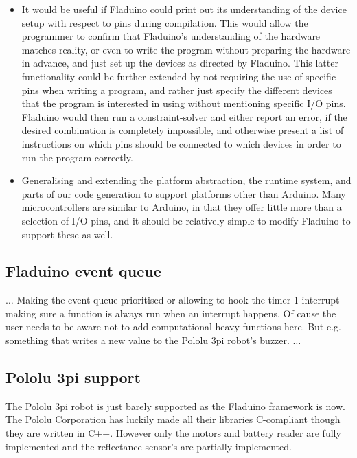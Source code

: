 \documentclass[a4paper, oneside, final]{memoir}
\begin{document}
\begin{itemize}
\item It would be useful if Fladuino could print out its understanding
  of the device setup with respect to pins during compilation.  This
  would allow the programmer to confirm that Fladuino's understanding
  of the hardware matches reality, or even to write the program
  without preparing the hardware in advance, and just set up the
  devices as directed by Fladuino.  This latter functionality could be
  further extended by not requiring the use of specific pins when
  writing a program, and rather just specify the different devices
  that the program is interested in using without mentioning specific
  I/O pins.  Fladuino would then run a constraint-solver and either
  report an error, if the desired combination is completely
  impossible, and otherwise present a list of instructions on which
  pins should be connected to which devices in order to run the
  program correctly.
\item Generalising and extending the platform abstraction, the runtime
  system, and parts of our code generation to support platforms other
  than Arduino.  Many microcontrollers are similar to Arduino, in that
  they offer little more than a selection of I/O pins, and it should
  be relatively simple to modify Fladuino to support these as well.
\end{itemize}

\subsection{Fladuino event queue}
\label{sec:fladuino-event-queue}
$\ldots$
Making the event queue prioritised or allowing to hook the timer 1 interrupt
making sure a function is always run when an interrupt happens. Of cause the
user needs to be aware not to add computational heavy functions here. But
e.g. something that writes a new value to the Pololu 3pi robot's buzzer.
$\ldots$

\subsection{Pololu 3pi support}

The Pololu 3pi robot is just barely supported as the Fladuino framework is
now. The Pololu Corporation has luckily made all their libraries C-compliant
though they are written in C++. However only the motors and battery reader are
fully implemented and the reflectance sensor's are partially implemented.
\end{document}
